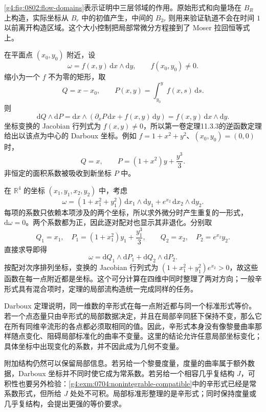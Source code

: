 

\cref{g4:fig:0802:flow-domains}表示证明中三层邻域的作用。原始形式和向量场在 \(B_R\) 上构造，实际坐标从 \(B_r\) 中的初值产生，中间的 \(B_{2r}\) 则用来验证轨道不会在时间 \(1\) 以前离开构造区域。这个大小控制把局部常微分方程接到了 Moser 拉回恒等式上。

\begin{example}
	\label{g4:exm:0802:surface-coordinates}
	在平面点 \((x_0,y_0)\) 附近，设
	\[
		\omega=f(x,y)\,\mathrm{d}x\wedge\mathrm{d}y,\qquad
		f(x_0,y_0)\ne0.
	\]
	缩小为一个 \(f\) 不为零的矩形，取
	\[
		Q=x-x_0,\qquad
		P(x,y)=\int_{y_0}^{y}f(x,s)\,\mathrm{d}s.
	\]
	则
	\[
		\mathrm{d}Q\wedge\mathrm{d}P
		=\mathrm{d}x\wedge
		\left(\partial_xP\,\mathrm{d}x+f(x,y)\,\mathrm{d}y\right)
		=f(x,y)\,\mathrm{d}x\wedge\mathrm{d}y.
	\]
	坐标变换的 Jacobian 行列式为 \(f(x,y)\ne0\)，所以第一卷定理11.3.3的逆函数定理给出以该点为中心的 Darboux 坐标。例如 \(f=1+x^2+y^2\)、\((x_0,y_0)=(0,0)\) 时，
	\[
		Q=x,\qquad P=(1+x^2)y+\frac{y^3}{3}.
	\]
	非恒定的面积系数被吸收到新坐标 \(P\) 中。
\end{example}

\begin{example}
	\label{g4:exm:0802:separated-four-dimensional}
	在 \(\mathbb R^4\) 的坐标 \((x_1,y_1,x_2,y_2)\) 中，考虑
	\[
		\omega=(1+x_1^2+y_1^2)\,\mathrm{d}x_1\wedge\mathrm{d}y_1
		+e^{x_2}\,\mathrm{d}x_2\wedge\mathrm{d}y_2.
	\]
	每项的系数只依赖本项涉及的两个坐标，所以求外微分时产生重复的一形式，\(\mathrm{d}\omega=0\)。两个系数都为正，因此逐对配对也显示其非退化。分别取
	\[
		Q_1=x_1,\quad P_1=(1+x_1^2)y_1+\frac{y_1^3}{3},
		\qquad
		Q_2=x_2,\quad P_2=e^{x_2}y_2.
	\]
	直接求导即得
	\[
		\omega=\mathrm{d}Q_1\wedge\mathrm{d}P_1
		+\mathrm{d}Q_2\wedge\mathrm{d}P_2.
	\]
	按配对次序排列坐标，变换的 Jacobian 行列式为
	\((1+x_1^2+y_1^2)e^{x_2}>0\)，故这些函数在每一点附近都是坐标。这个可分计算在四维中同时整理了两对方向；一般辛形式具有混合项时，定理的局部流构造统一完成同样的任务。
\end{example}

Darboux 定理说明，同一维数的辛形式在每一点附近都与同一个标准形式等价。若一个点态量只由辛形式的局部数据决定，并且在局部辛同胚下保持不变，那么它在所有同维辛流形的各点都必须取相同的值。因此，辛形式本身没有像黎曼曲率那样随点变化、阻碍局部标准化的曲率不变量。这里的结论允许任意局部坐标变化；具体坐标中出现变化的系数，并不因此成为几何不变量。

\ProseParagraphBreak

附加结构仍然可以保留局部信息。若另给一个黎曼度量，度量的曲率属于额外数据，Darboux 坐标并不同时使它成为常系数。若另给一个相容几乎复结构 \(J\)，可积性也要另外检验：\cref{g4:exm:0704:nonintegrable-compatible}中的辛形式已经是常系数形式，但所给 \(J\) 处处不可积。局部标准形整理的是辛形式；同时保持度量或几乎复结构，会提出更强的等价要求。
